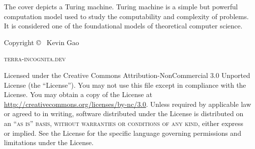 \documentclass[11pt,fleqn,dvipsnames]{book} %
\begin{document}




\newpage
The cover depicts a Turing machine. Turing machine is a simple but powerful computation model used to study the computability and complexity of problems. It is considered one of the foundational models of theoretical computer science.
~\vfill
\thispagestyle{empty}

\noindent Copyright \copyright\ \the\year{} Kevin Gao %

\hfill

\noindent \textsc{terra-incognita.dev} %

\hfill

\noindent Licensed under the Creative Commons Attribution-NonCommercial 3.0 Unported License (the ``License''). You may not use this file except in compliance with the License. You may obtain a copy of the License at \url{http://creativecommons.org/licenses/by-nc/3.0}. Unless required by applicable law or agreed to in writing, software distributed under the License is distributed on an \textsc{``as is'' basis, without warranties or conditions of any kind}, either express or implied. See the License for the specific language governing permissions and limitations under the License.





\pagestyle{empty} %
\usechapterimagefalse
\tableofcontents %

\cleardoublepage %
\end{document}
